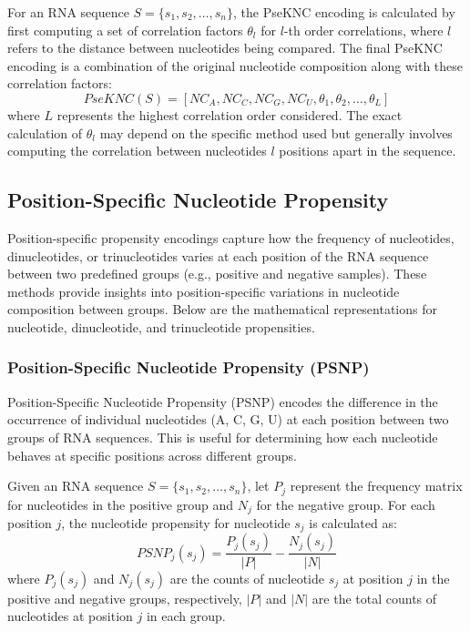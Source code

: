       For an RNA sequence $S = \{s_1, s_2, \dots, s_n\}$, the PseKNC encoding is calculated by first computing a set of correlation factors $\theta_l$ for $l$-th order correlations, where $l$ refers to the distance between nucleotides being compared. The final PseKNC encoding is a combination of the original nucleotide composition along with these correlation factors:
      \[
        PseKNC(S) = [NC_A, NC_C, NC_G, NC_U, \theta_1, \theta_2, \dots, \theta_L]
      \]
      where $L$ represents the highest correlation order considered.
      The exact calculation of $\theta_l$ may depend on the specific method used but generally involves computing the correlation between nucleotides $l$ positions apart in the sequence.

  \subsection{Position-Specific Nucleotide Propensity}\label{subsec:position-specific-nucleotide-propensity}
    Position-specific propensity encodings capture how the frequency of nucleotides, dinucleotides, or trinucleotides varies at each position of the RNA sequence between two predefined groups (e.g., positive and negative samples). These methods provide insights into position-specific variations in nucleotide composition between groups. Below are the mathematical representations for nucleotide, dinucleotide, and trinucleotide propensities.

    \subsubsection{Position-Specific Nucleotide Propensity (PSNP)}\label{subsubsec:PSNP}
      Position-Specific Nucleotide Propensity (PSNP) encodes the difference in the occurrence of individual nucleotides (A, C, G, U) at each position between two groups of RNA sequences.
      This is useful for determining how each nucleotide behaves at specific positions across different groups.

      Given an RNA sequence $S = \{s_1, s_2, \dots, s_n\}$, let $P_j$ represent the frequency matrix for nucleotides in the positive group and $N_j$ for the negative group.
      For each position $j$, the nucleotide propensity for nucleotide $s_j$ is calculated as:
      \[
        PSNP_j(s_j) = \frac{P_j(s_j)}{|P|} - \frac{N_j(s_j)}{|N|}
      \]
      where $P_j(s_j)$ and $N_j(s_j)$ are the counts of nucleotide $s_j$ at position $j$ in the positive and negative groups, respectively, $|P|$ and $|N|$ are the total counts of nucleotides at position $j$ in each group.

